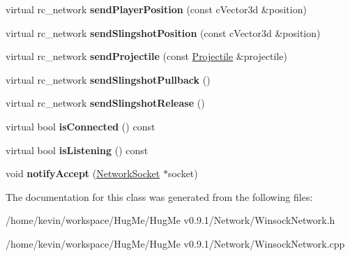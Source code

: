 \begin{DoxyCompactItemize}
\item 
\hypertarget{classWinsockNetwork_ab27dd7393a89573f9e75e1a50efbc833}{
virtual rc\_\-network {\bfseries sendPlayerPosition} (const cVector3d \&position)}
\label{classWinsockNetwork_ab27dd7393a89573f9e75e1a50efbc833}

\item 
\hypertarget{classWinsockNetwork_af0456294cf39244cc59f1ca81e2aa2d3}{
virtual rc\_\-network {\bfseries sendSlingshotPosition} (const cVector3d \&position)}
\label{classWinsockNetwork_af0456294cf39244cc59f1ca81e2aa2d3}

\item 
\hypertarget{classWinsockNetwork_accb610c314dd94a1649bcfe101c93997}{
virtual rc\_\-network {\bfseries sendProjectile} (const \hyperlink{classProjectile}{Projectile} \&projectile)}
\label{classWinsockNetwork_accb610c314dd94a1649bcfe101c93997}

\item 
\hypertarget{classWinsockNetwork_a0a8ced3a30f215e71114b9fa94b3d1e3}{
virtual rc\_\-network {\bfseries sendSlingshotPullback} ()}
\label{classWinsockNetwork_a0a8ced3a30f215e71114b9fa94b3d1e3}

\item 
\hypertarget{classWinsockNetwork_ac4076b605f2378bf8728be6730512f95}{
virtual rc\_\-network {\bfseries sendSlingshotRelease} ()}
\label{classWinsockNetwork_ac4076b605f2378bf8728be6730512f95}

\item 
\hypertarget{classWinsockNetwork_a8c621566b7ce641d86797569346fcaad}{
virtual bool {\bfseries isConnected} () const }
\label{classWinsockNetwork_a8c621566b7ce641d86797569346fcaad}

\item 
\hypertarget{classWinsockNetwork_a7cbc0e15323359b9bdb862342e406f23}{
virtual bool {\bfseries isListening} () const }
\label{classWinsockNetwork_a7cbc0e15323359b9bdb862342e406f23}

\item 
\hypertarget{classWinsockNetwork_a011b39d509309dd98f3b798e7c6b7c62}{
void {\bfseries notifyAccept} (\hyperlink{classNetworkSocket}{NetworkSocket} $\ast$socket)}
\label{classWinsockNetwork_a011b39d509309dd98f3b798e7c6b7c62}

\end{DoxyCompactItemize}


The documentation for this class was generated from the following files:\begin{DoxyCompactItemize}
\item 
/home/kevin/workspace/HugMe/HugMe v0.9.1/Network/WinsockNetwork.h\item 
/home/kevin/workspace/HugMe/HugMe v0.9.1/Network/WinsockNetwork.cpp\end{DoxyCompactItemize}
